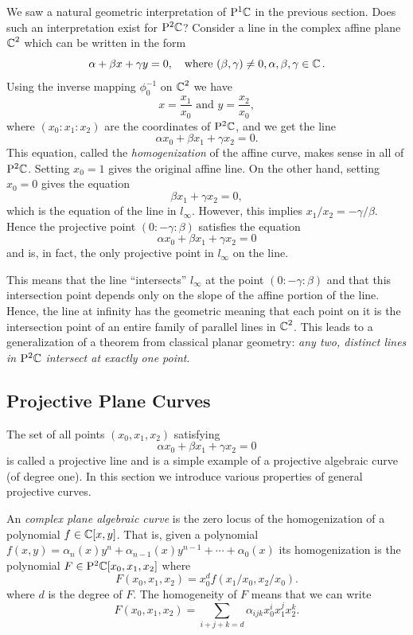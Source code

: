 We saw a natural geometric interpretation of $\mathrm{P}^1 \!\operatorname{\mathbb{C}}$ in the previous
section. Does such an interpretation exist for $\mathrm{P}^2 \!\operatorname{\mathbb{C}}$? Consider a line in
the complex affine plane $\operatorname{\mathbb{C}}^2$ which can be written in the form
\[
  \alpha + \beta x + \gamma y = 0, \quad \text{where } (\beta,\gamma) \neq 0,
  \alpha, \beta, \gamma \in \operatorname{\mathbb{C}}.
\]
Using the inverse mapping $\phi_0^{-1}$ on $\operatorname{\mathbb{C}}^2$ we have
\[
  x = \frac{x_1}{x_0} \text{ and } y = \frac{x_2}{x_0},
\]
where $(x_0 : x_1 : x_2)$ are the coordinates of $\mathrm{P}^2 \!\operatorname{\mathbb{C}}$, and we get the
line
\[
  \alpha x_0 + \beta x_1 + \gamma x_2 = 0.
\]
This equation, called the {\it homogenization} of the affine curve, makes sense
in all of $\mathrm{P}^2 \!\operatorname{\mathbb{C}}$. Setting $x_0 = 1$ gives the original affine line. On the
other hand, setting $x_0 = 0$ gives the equation
\[
  \beta x_1 + \gamma x_2 = 0,
\]
which is the equation of the line in $l_\infty$. However, this implies $x_1 /
x_2 = - \gamma / \beta$. Hence the projective point $(0 : -\gamma : \beta)$
satisfies the equation
\[
  \alpha x_0 + \beta x_1 + \gamma x_2 = 0
\]
and is, in fact, the only projective point in $l_\infty$ on the line.

This means that the line ``intersects'' $l_\infty$ at the point $(0 : -\gamma :
\beta)$ and that this intersection point depends only on the slope of the affine
portion of the line. Hence, the line at infinity has the geometric meaning that
each point on it is the intersection point of an entire family of parallel lines
in $\operatorname{\mathbb{C}}^2$. This leads to a generalization of a theorem from classical planar
geometry: {\it any two, distinct lines in $\mathrm{P}^2 \!\operatorname{\mathbb{C}}$ intersect at exactly one
  point}.

\subsection{Projective Plane Curves} \label{sec: projective-plane-curves}

The set of all points $(x_0, x_1, x_2)$ satisfying
\[
  \alpha x_0 + \beta x_1 + \gamma x_2 = 0
\]
is called a projective line and is a simple example of a projective algebraic
curve (of degree one). In this section we introduce various properties of
general projective curves.

An {\it complex plane algebraic curve} is the zero locus of the homogenization
of a polynomial $f \in \operatorname{\mathbb{C}}[x,y]$. That is, given a polynomial $f(x,y) =
\alpha_n(x) y^n + \alpha_{n-1}(x)y^{n-1} + \cdots + \alpha_0(x)$ its
homogenization is the polynomial $F \in \mathrm{P}^2 \!\operatorname{\mathbb{C}}[x_0,x_1,x_2]$ where
\[
  F(x_0,x_1,x_2) = x_0^d f(x_1/x_0,x_2/x_0).
\]
where $d$ is the degree of $F$. The homogeneity of $F$ means that we can write
\[
  F(x_0,x_1,x_2) = \sum_{i+j+k=d} \alpha_{ijk} x_0^i x_1^j x_2^k.
\]

